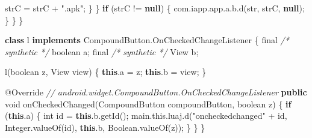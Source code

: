 \documentclass[
]{article}
\newenvironment{Shaded}{}{}
\newcommand{\AttributeTok}[1]{\textcolor[rgb]{0.49,0.56,0.16}{#1}}
\newcommand{\BuiltInTok}[1]{\textcolor[rgb]{0.00,0.50,0.00}{#1}}
\newcommand{\CommentTok}[1]{\textcolor[rgb]{0.38,0.63,0.69}{\textit{#1}}}
\newcommand{\ControlFlowTok}[1]{\textcolor[rgb]{0.00,0.44,0.13}{\textbf{#1}}}
\newcommand{\DataTypeTok}[1]{\textcolor[rgb]{0.56,0.13,0.00}{#1}}
\newcommand{\FunctionTok}[1]{\textcolor[rgb]{0.02,0.16,0.49}{#1}}
\newcommand{\KeywordTok}[1]{\textcolor[rgb]{0.00,0.44,0.13}{\textbf{#1}}}
\newcommand{\NormalTok}[1]{#1}
\newcommand{\OperatorTok}[1]{\textcolor[rgb]{0.40,0.40,0.40}{#1}}
\newcommand{\StringTok}[1]{\textcolor[rgb]{0.25,0.44,0.63}{#1}}
\begin{document}
\begin{Shaded}
\begin{Highlighting}[]
\NormalTok{                    strC }\OperatorTok{=}\NormalTok{ strC }\OperatorTok{+} \StringTok{".apk"}\OperatorTok{;}
                \OperatorTok{\}}
            \OperatorTok{\}}
            \ControlFlowTok{if} \OperatorTok{(}\NormalTok{strC }\OperatorTok{!=} \KeywordTok{null}\OperatorTok{)} \OperatorTok{\{}
\NormalTok{                com}\OperatorTok{.}\FunctionTok{iapp}\OperatorTok{.}\FunctionTok{app}\OperatorTok{.}\FunctionTok{a}\OperatorTok{.}\FunctionTok{b}\OperatorTok{.}\FunctionTok{d}\OperatorTok{(}\NormalTok{str}\OperatorTok{,}\NormalTok{ strC}\OperatorTok{,} \KeywordTok{null}\OperatorTok{);}
            \OperatorTok{\}}
        \OperatorTok{\}}
    \OperatorTok{\}}

    \KeywordTok{class}\NormalTok{ l }\KeywordTok{implements}\NormalTok{ CompoundButton}\OperatorTok{.}\FunctionTok{OnCheckedChangeListener} \OperatorTok{\{}
        \DataTypeTok{final} \CommentTok{/* synthetic */} \DataTypeTok{boolean}\NormalTok{ a}\OperatorTok{;}
        \DataTypeTok{final} \CommentTok{/* synthetic */} \BuiltInTok{View}\NormalTok{ b}\OperatorTok{;}

        \FunctionTok{l}\OperatorTok{(}\DataTypeTok{boolean}\NormalTok{ z}\OperatorTok{,} \BuiltInTok{View}\NormalTok{ view}\OperatorTok{)} \OperatorTok{\{}
            \KeywordTok{this}\OperatorTok{.}\FunctionTok{a} \OperatorTok{=}\NormalTok{ z}\OperatorTok{;}
            \KeywordTok{this}\OperatorTok{.}\FunctionTok{b} \OperatorTok{=}\NormalTok{ view}\OperatorTok{;}
        \OperatorTok{\}}

        \AttributeTok{@Override} \CommentTok{// android.widget.CompoundButton.OnCheckedChangeListener}
        \KeywordTok{public} \DataTypeTok{void} \FunctionTok{onCheckedChanged}\OperatorTok{(}\NormalTok{CompoundButton compoundButton}\OperatorTok{,} \DataTypeTok{boolean}\NormalTok{ z}\OperatorTok{)} \OperatorTok{\{}
            \ControlFlowTok{if} \OperatorTok{(}\KeywordTok{this}\OperatorTok{.}\FunctionTok{a}\OperatorTok{)} \OperatorTok{\{}
                \DataTypeTok{int}\NormalTok{ id }\OperatorTok{=} \KeywordTok{this}\OperatorTok{.}\FunctionTok{b}\OperatorTok{.}\FunctionTok{getId}\OperatorTok{();}
\NormalTok{                main}\OperatorTok{.}\FunctionTok{this}\OperatorTok{.}\FunctionTok{luaj}\OperatorTok{.}\FunctionTok{d}\OperatorTok{(}\StringTok{"oncheckedchanged"} \OperatorTok{+}\NormalTok{ id}\OperatorTok{,} \BuiltInTok{Integer}\OperatorTok{.}\FunctionTok{valueOf}\OperatorTok{(}\NormalTok{id}\OperatorTok{),} \KeywordTok{this}\OperatorTok{.}\FunctionTok{b}\OperatorTok{,} \BuiltInTok{Boolean}\OperatorTok{.}\FunctionTok{valueOf}\OperatorTok{(}\NormalTok{z}\OperatorTok{));}
            \OperatorTok{\}}
        \OperatorTok{\}}
    \OperatorTok{\}}


\end{Highlighting}
\end{Shaded}
\end{document}
